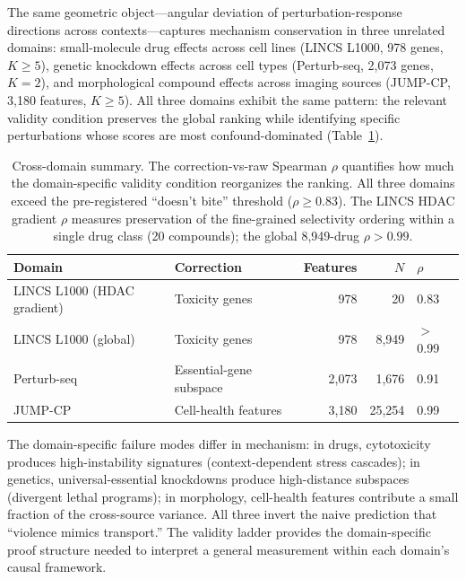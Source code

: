 \documentclass{article}
\begin{document}
The same geometric object---angular deviation of perturbation-response
directions across contexts---captures mechanism conservation in three
unrelated domains: small-molecule drug effects across cell lines (LINCS
L1000, 978 genes, $K \geq 5$), genetic knockdown effects across
cell types (Perturb-seq, 2{,}073 genes, $K = 2$), and morphological
compound effects across imaging sources (JUMP-CP, 3{,}180 features,
$K \geq 5$). All three domains exhibit the same pattern: the relevant
validity condition preserves the global ranking while identifying specific
perturbations whose scores are most confound-dominated
(Table~\ref{tab:cross_domain}).

\begin{table}[t]
\centering
\caption{Cross-domain summary. The correction-vs-raw Spearman $\rho$
quantifies how much the domain-specific validity condition reorganizes
the ranking. All three domains exceed the pre-registered ``doesn't bite''
threshold ($\rho \geq 0.83$). The LINCS HDAC gradient $\rho$ measures
preservation of the fine-grained selectivity ordering within a single drug
class (20 compounds); the global 8{,}949-drug $\rho > 0.99$.}
\label{tab:cross_domain}
\small
\begin{tabular}{llrrl}
\toprule
Domain & Correction & Features & $N$ & $\rho$ \\
\midrule
LINCS L1000 (HDAC gradient) & Toxicity genes & 978 & 20 & 0.83 \\
LINCS L1000 (global) & Toxicity genes & 978 & 8{,}949 & $>$0.99 \\
Perturb-seq & Essential-gene subspace & 2{,}073 & 1{,}676 & 0.91 \\
JUMP-CP & Cell-health features & 3{,}180 & 25{,}254 & 0.99 \\
\bottomrule
\end{tabular}
\end{table}

The domain-specific failure modes differ in mechanism: in drugs, cytotoxicity
produces high-instability signatures (context-dependent stress cascades); in
genetics, universal-essential knockdowns produce high-distance subspaces
(divergent lethal programs); in morphology, cell-health features contribute
a small fraction of the cross-source variance. All three invert the naive
prediction that ``violence mimics transport.'' The validity ladder provides
the domain-specific proof structure needed to interpret a general measurement
within each domain's causal framework.
\end{document}
